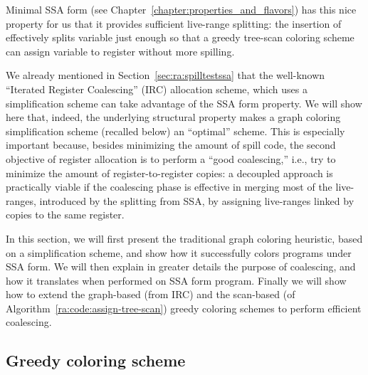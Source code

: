 {Minimal SSA form (see Chapter~\ref{chapter:properties_and_flavors}) has this nice property for us that it provides sufficient live-range splitting: the insertion of \phifuns effectively splits variable just enough so that a greedy tree-scan coloring scheme can assign variable to register without more spilling.


We already mentioned in Section~\ref{sec:ra:spilltestssa} that the well-known ``Iterated Register Coalescing'' (IRC) allocation scheme, which uses a simplification scheme can take advantage of the SSA form property.
We will show here that, indeed, the underlying structural property makes a graph coloring simplification scheme (recalled below) an ``optimal'' scheme.
This is especially important because, besides minimizing the amount of spill code, the second objective of register allocation is to perform a ``good coalescing,'' i.e., try to minimize the amount of register-to-register copies:
a decoupled approach is practically viable if the coalescing phase is effective in merging most of the live-ranges, introduced by the splitting from SSA, by assigning live-ranges linked by copies to the same register.

In this section, we will first present the traditional graph coloring heuristic, based on a simplification scheme, and show how it successfully colors programs under SSA form.
We will then explain in greater details the purpose of coalescing, and how it translates when performed on SSA form program.
Finally we will show how to extend the graph-based (from IRC) and the scan-based (of Algorithm~\ref{ra:code:assign-tree-scan}) greedy coloring schemes to perform efficient coalescing.


\subsection{Greedy coloring scheme}
\label{sec:ra:greedy-col}

}
